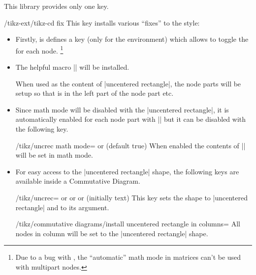 This library provides only one key.
\begin{stylekey}{/tikz-ext/tikz-cd fix}
This key installs various \enquote{fixes} to the  style:

\begin{itemize}
\item Firstly, is defines a  key (only for the  environment)
      which allows to toggle the  for each node.%
      \footnote{Due to a bug with , the \enquote{automatic} math mode in matrices can't be used
        with multipart nodes.}
\item The helpful macro |\uncrec| will be installed.
\begin{command}{\uncrec{}}
  When used as the content of |uncentered rectangle|,
  the node parts will be setup so that  is in the left part of the node part etc.
\end{command}
\item Since math mode will be disabled with the |uncentered rectangle|, it is automatically enabled for each node part with |\uncrec| but it can be disabled with the following key.
\begin{key}{/tikz/uncrec math mode=\textrm{ or } (default true)}
When enabled the contents of |\uncrec| will be set in math mode.
\end{key}
\item For easy access to the |uncentered rectangle| shape, the following keys are available inside a Commutative Diagram.
\begin{stylekey}{/tikz/uncrec=\textrm{ or }\textrm{ or }\textrm{ or } (initially text)}
This key sets the shape to |uncentered rectangle| and  to its argument.
\end{stylekey}
\begin{stylekey}{/tikz/commutative diagrams/install uncentered rectangle in columns=}
All nodes in column  will be set to the |uncentered rectangle| shape.
\end{stylekey}
\end{itemize}
\end{stylekey}

